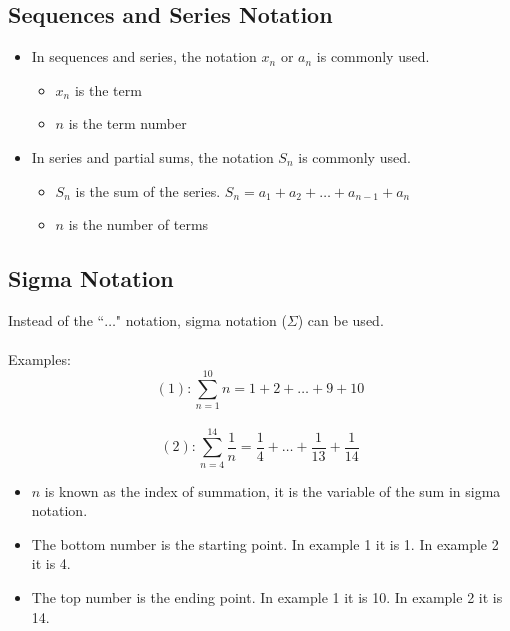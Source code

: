 \documentclass[12pt]{article}
\begin{document}
\subsection{Sequences and Series Notation}
\begin{itemize}
    \item In sequences and series, the notation $x_n$ or $a_n$ is commonly used.
    \begin{itemize}
        \item $x_n$ is the term
        \item $n$ is the term number
    \end{itemize}
    \item In series and partial sums, the notation $S_n$ is commonly used.
    \begin{itemize}
        \item $S_n$ is the sum of the series. $S_n = a_1 + a_2 + \dots + a_{n-1} + a_n$
        \item $n$ is the number of terms
    \end{itemize}
\end{itemize}
\subsection{Sigma Notation}
Instead of the ``$\dots$" notation, sigma notation ($\Sigma$) can be used. \\ \\
Examples:
$$(1): \sum_{n=1}^{10} n = 1 + 2 + \dots + 9 + 10$$\\
$$(2): \sum_{n=4}^{14} \frac{1}{n} = \frac{1}{4} + \dots + \frac{1}{13} + \frac{1}{14}$$
\begin{itemize}
    \item $n$ is known as the index of summation, it is the variable of the sum in sigma notation.
    \item The bottom number is the starting point. In example 1 it is 1. In example 2 it is 4.
    \item The top number is the ending point. In example 1 it is 10. In example 2 it is 14. 
\end{itemize}
\end{document}

